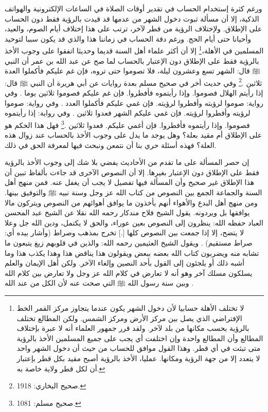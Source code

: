 ورغم كثرة إستخدام الحساب في تقدير أوقات الصلاة في الساعات الإلكترونية والهواتف الذكية، إلا أن مسألة ثبوت دخول الشهر من عدمها قد قيدت بالرؤية فقط دون الحساب على الإطلاق. ولإختلاف الرؤية من قطر لآخر، ترتب على هذا إختلاف أيام الصوم، والعيد، وأحيانا حتى أيام الحج. ورغم دقة الحساب في زماننا هذا والذي قد يكون سببا لتوحيد المسلمين في الأهلة،\footnote{لا تختلف الأهلة حسابيا لأن دخول الشهر يكون عندما يتجاوز مركز القمر الخط الإفتراضي الذي يصل بين مركز الأرض ومركز الشمس. ولكن المطالع تختلف بالرؤية بحسب مكانها من بلد لآخر. ولقد قرر جمهور العلماء أنه لا عبرة بإختلاف المطالع وأن المطالع واحدة وإن اختلفت أي يجب على جميع المسلمين الأخذ بالرؤية متى تبثت في أي قطر. وهذا القول موافق للحساب من حيث أن دخول الشهر واحد لا يتعدد إلا من جهة الرؤية ومكانها. عمليا، الأخذ بالرؤية أصبح مقيد بكل قطر بإعتبار أن لكل قطر ولاية خاصة به.} إلا أن أكثر علماء أهل السنة قديما وحديثا اتفقوا على وجوب الأخذ بالرؤية فقط على الإطلاق دون الإعتبار بالحساب لما صح عن عبد الله بن عمر أن النبي ﷺ قال: الشهر تسع وعشرون ليلة، فلا تصوموا حتى تروه، فإن غم عليكم فأكملوا العدة ثلاثين \href{https://shamela.ws/book/1284/1257#p1}{\faExternalLink} \cite{bukhari}.\footnote{صحيح البخاري: 1918.} وفي حديث أخر في صحيح مسلم بعدة روايات عن أبي هريرة أن النبي ﷺ قال: إذا رأيتم الهلال فصوموا. وإذا رأيتموه فأفطروا. فإن غم عليكم فصوموا ثلاثين يوما \href{https://shamela.ws/book/1727/2446#p2}{\faExternalLink}. وفي رواية: صوموا لرؤيته وأفطروا لرؤيته. فإن غمي عليكم فأكملوا العدد \href{https://shamela.ws/book/1727/2447#p2}{\faExternalLink}. وفي رواية: صوموا لرؤيته وأفطروا لرؤيته. فإن غمي عليكم الشهر فعدوا ثلاثين \href{https://shamela.ws/book/1727/2448#p2}{\faExternalLink}. وفي رواية: إذا رأيتموه فصوموا. وإذا رأيتموه فأفطروا. فإن أغمي عليكم. فعدوا ثلاثين \href{https://shamela.ws/book/1727/2449#p2}{\faExternalLink} \cite{muslim}.\footnote{صحيح مسلم: 1081.} فهل هذا الحكم هو على الإطلاق أم مقيد بعلة؟ وهل يوجد ما يدل على وجوب الأخذ بالحساب عند زوال هذه العلة؟ فهذه أسئلة حري بنا أن نتمعن ونبحث فيها لمعرفة الحق في ذلك.

إن حصر المسألة على ما تقدم من الأحاديث يفضي بلا شك إلى وجوب الأخذ بالرؤية فقط على الإطلاق دون الإعتبار بغيرها. إلا أن النصوص الآخرى قد جاءت بألفاظ تبين أن هذا الإطلاق غير صحيح وأن المسألة فيها تفصيل لا يجب أن يغفل عنه. فمن منهج أهل السنة والجماعة الجمع بين النصوص من كتاب الله عز وجل وسنة نبيه ﷺ والتوفيق بينها. ومن منهج أهل البدع والأهواء أنهم يأخذون ما يوافق أهوائهم من النصوص ويتركون مالا يوافقها بل ويردونه. يقول الشيخ فلاح مندكار رحمه الله نقلا عن الشيخ عبد المحسن العباد حفظه الله: ينظرون إلى النصوص بعين عوراء، والحق لا يكتمل، ودين الله جل وعلا لا يتضح، إلا إذا جمعت بين النصوص كلها [.] تخرج بمذهب وصراط (وأشار بيده أي: صراط مستقيم) \href{https://www.youtube.com/watch?v=PEQsmhJX51w}{\faExternalLink}. ويقول الشيخ العثيمين رحمه الله: والذين في قلوبهم زيغ يتبعون ما تشابه منه ويضربون كتاب الله بعضه ببعض ويقولون هذا يناقض هذا وهذا يكذب هذا وما أشبه ذلك أو يلجئون إلى القول بأحد النصين وإلغاء الآخر. ولكن أهل الإيمان والعلم يسلكون مسلك آخر وهو أنه لا تعارض في كلام الله عز وجل ولا تعارض بين كلام الله وبين سنة رسول الله ﷺ التي صحت عنه لأن الكل من عند الله \href{https://www.youtube.com/watch?v=KvRTXkTmeew}{\faExternalLink}.

